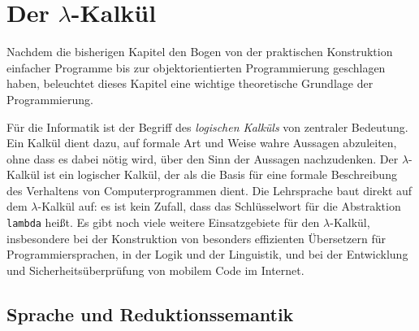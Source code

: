 
\chapter{Der $\lambda$-Kalkül}
\label{chap:lambda}


Nachdem die bisherigen Kapitel den Bogen von der praktischen Konstruktion
einfacher Programme bis zur
objektorientierten Programmierung geschlagen haben, beleuchtet dieses Kapitel
eine wichtige theoretische Grundlage der
Programmierung.

Für die Informatik ist der Begriff des \emph{logischen Kalküls} von zentraler Bedeutung.
Ein Kalkül dient dazu, auf formale Art und Weise wahre Aussagen abzuleiten, ohne dass
es dabei nötig wird, über den Sinn der Aussagen nachzudenken.   
Der $\lambda$-Kalkül ist ein logischer Kalkül, der als die Basis für
eine formale Beschreibung des Verhaltens von Computerprogrammen dient.
Die Lehrsprache baut direkt auf dem $\lambda$-Kalkül auf: es ist kein
Zufall, dass das Schlüsselwort für die Abstraktion \texttt{lambda}
heißt.  Es gibt noch viele weitere Einsatzgebiete für den $\lambda$-Kalkül,
insbesondere bei der Konstruktion von besonders effizienten
Übersetzern für Programmiersprachen, in der Logik und der Linguistik,
und bei der Entwicklung und Sicherheitsüberprüfung von mobilem Code im
Internet.

\section{Sprache und Reduktionssemantik}
\label{sec:sprache}

